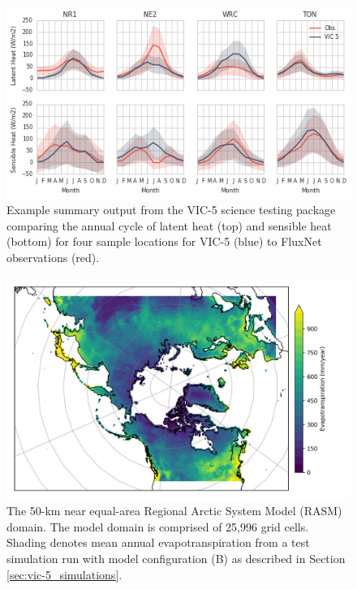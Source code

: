 \documentclass[gmd, manuscript]{copernicus}
\begin{document}
\clearpage
\begin{figure}[t]
\includegraphics[width=12cm]{VIC_science_tests_fluxes.png}
\caption{Example summary output from the VIC-5 science testing package comparing the annual cycle of latent heat (top) and sensible heat (bottom) for four sample locations for VIC-5 (blue) to FluxNet observations (red).}
\label{fig:vic_fluxes}
\end{figure}

\clearpage
\begin{figure}[t]
\includegraphics[width=6in]{RASM_domain_fig.png}
\caption{The 50-km near equal-area Regional Arctic System Model (RASM) domain. The model domain is comprised of 25,996 grid cells. Shading denotes mean annual evapotranspiration from a test simulation run with model configuration (B) as described in Section \ref{sec:vic-5_simulations}.}
\label{fig:vic_domain}
\end{figure}
\end{document}
